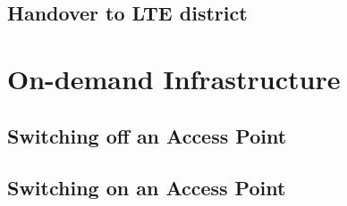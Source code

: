 \subsection{Handover to LTE district}\label{sec:chap4_host_based_lte}

\section{On-demand Infrastructure}\label{sec:chap4_ondemand}

\subsection{Switching off an Access Point}\label{sec:chap4_host_based_lte}

\subsection{Switching on an Access Point}\label{sec:chap4_host_based_lte}


